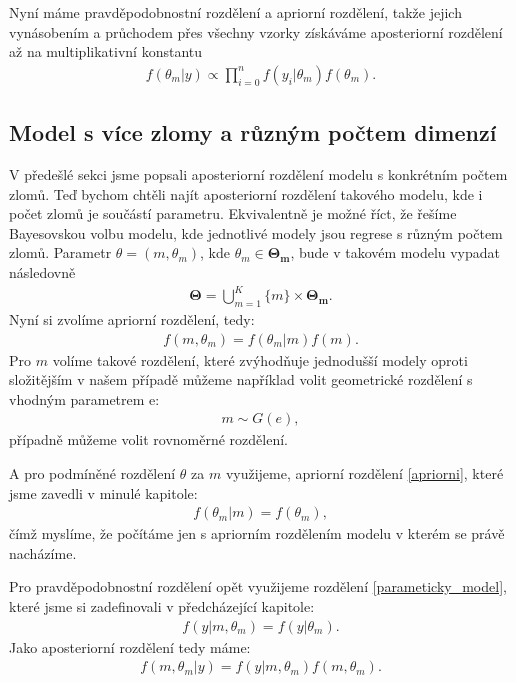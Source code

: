 \documentclass[czech,master,public,dept470,male,cpdeclaration,oneside, python]{diploma}
\begin{document}
Nyní máme pravděpodobnostní rozdělení a apriorní rozdělení, takže jejich vynásobením a průchodem přes všechny vzorky získáváme aposteriorní rozdělení až na multiplikativní konstantu
\begin{align}
f(\theta_m | y) \propto \prod_{i=0}^{n} f(y_i | \theta_m) f(\theta_m).
\end{align}
\subsection{Model s více zlomy a různým počtem dimenzí}
V předešlé sekci jsme popsali aposteriorní rozdělení modelu s konkrétním počtem zlomů. Teď bychom chtěli najít aposteriorní rozdělení takového modelu, kde i počet zlomů je součástí parametru. Ekvivalentně je možné říct, že řešíme Bayesovskou volbu modelu, kde jednotlivé modely jsou regrese s různým počtem zlomů. Parametr $\theta = (m, \theta_m)$, kde $\theta_m \in \boldsymbol{\Theta_m}$, bude v takovém modelu vypadat následovně 
\begin{align}
\boldsymbol{\Theta} = \bigcup_{m=1}^K\{m\} \times \boldsymbol{\Theta_m}.
\end{align}
 Nyní si zvolíme apriorní rozdělení, tedy:
\begin{align}
f(m, \theta_m) = f(\theta_m | m)f(m).
\end{align}
Pro $m$ volíme takové rozdělení, které zvýhodňuje jednodušší modely oproti složitějším v našem případě můžeme například volit geometrické rozdělení s vhodným parametrem e:
\begin{align}
m \sim G(e),
\end{align}
případně můžeme volit rovnoměrné rozdělení. \par
A pro podmíněné rozdělení $\theta$ za $m$ využijeme, apriorní rozdělení \eqref{apriorni}, které jsme zavedli v minulé kapitole:
\begin{align}
f(\theta_m | m) = f(\theta_m),
\end{align}
čímž myslíme, že počítáme jen s apriorním rozdělením modelu v kterém se právě nacházíme. \par 
Pro pravděpodobnostní rozdělení opět využijeme rozdělení \eqref{parameticky_model}, které jsme si zadefinovali v předcházející kapitole:
\begin{align}
f(y | m, \theta_m) = f(y | \theta_m).
\end{align}
Jako aposteriorní rozdělení tedy máme:
\begin{align}\label{supermodel}
	f(m, \theta_m | y) = f(y | m, \theta_m)f(m, \theta_m).
\end{align}
\end{document}
